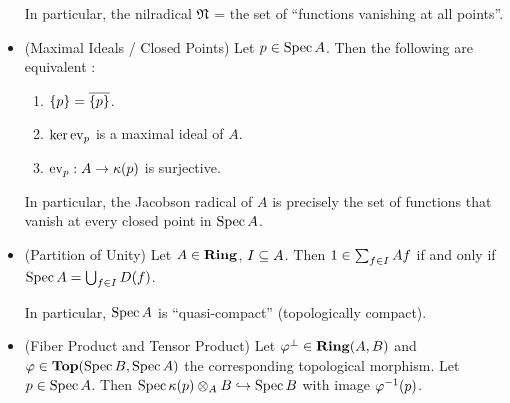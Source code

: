 \begin{prop}
\begin{itemize}
    In particular, the nilradical $\mathfrak{N}$ = the set of 
    ``functions vanishing at all points''.
    \item (Maximal Ideals / Closed Points)
    Let $p \in \operatorname{Spec} A$.
    Then the following are equivalent : 
    \begin{enumerate}
      \item $\left\{p\right\} = \overline{\left\{p\right\}}$.
      \item $\ker\operatorname{ev}_p$ is a maximal ideal of $A$.
      \item $\operatorname{ev}_p : A \to \kappa(p)$ is surjective.
    \end{enumerate}
    In particular, the Jacobson radical of $A$ is precisely the set of functions
    that vanish at every closed point in $\operatorname{Spec} A$.
    \item (Partition of Unity)
    Let $A \in \mathbf{Ring}$, $I \subseteq A$.
    Then $1 \in \sum_{f \in I}^{} Af$ if and only if 
    $\operatorname{Spec} A = \bigcup_{f \in I} D(f)$.

    In particular, $\operatorname{Spec} A$ is ``quasi-compact''
    (topologically compact).

    \item (Fiber Product and Tensor Product)
    Let $\varphi^\bot \in \mathbf{Ring}(A,B)$ and $\varphi \in \mathbf{Top}(\operatorname{Spec} B, \operatorname{Spec} A)$
    the corresponding topological morphism. 
    Let $p \in \operatorname{Spec} A$.
    Then $\operatorname{Spec} \kappa(p) \otimes_A B \hookrightarrow \operatorname{Spec} B$ 
    with image $\varphi^{-1}(p)$.
  \end{itemize}
\end{prop}
